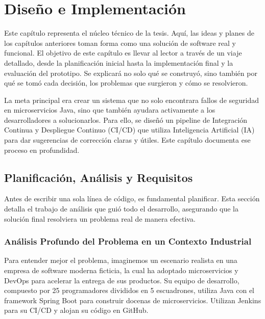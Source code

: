 
\chapter{Diseño e Implementación}
\label{chap:desarrollo}

Este capítulo representa el núcleo técnico de la tesis. Aquí, las ideas y planes de los capítulos anteriores toman forma como una solución de software real y funcional. El objetivo de este capítulo es llevar al lector a través de un viaje detallado, desde la planificación inicial hasta la implementación final y la evaluación del prototipo. Se explicará no solo qué se construyó, sino también por qué se tomó cada decisión, los problemas que surgieron y cómo se resolvieron.

La meta principal era crear un sistema que no solo encontrara fallos de seguridad en microservicios Java, sino que también ayudara activamente a los desarrolladores a solucionarlos. Para ello, se diseñó un pipeline de Integración Continua y Despliegue Continuo (CI/CD) que utiliza Inteligencia Artificial (IA) para dar sugerencias de corrección claras y útiles. Este capítulo documenta ese proceso en profundidad.

\section{Planificación, Análisis y Requisitos}
\label{sec:plani_desarrollo}

Antes de escribir una sola línea de código, es fundamental planificar. Esta sección detalla el trabajo de análisis que guió todo el desarrollo, asegurando que la solución final resolviera un problema real de manera efectiva.

\subsection{Análisis Profundo del Problema en un Contexto Industrial}

Para entender mejor el problema, imaginemos un escenario realista en una empresa de software moderna ficticia, la cual ha adoptado microservicios y DevOps para acelerar la entrega de sus productos. Su equipo de desarrollo, compuesto por 25 programadores divididos en 5 escuadrones, utiliza Java con el framework Spring Boot para construir docenas de microservicios. Utilizan Jenkins para su CI/CD y alojan su código en GitHub.

